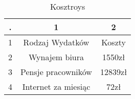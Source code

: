 \begin{table}[htbp]
\centering
\begin{tabular}{||c c c ||} 
 \hline
 . & 1 & 2  \\ [0.5ex] 
 \hline\hline
 1 & Rodzaj Wydatków & Koszty   \\ 
 \hline
 2 & Wynajem biura & 1550zł  \\
 \hline
 3 & Pensje pracowników & 12839zł  \\
 \hline
 4 & Internet za miesiąc & 72zł  \\
 \hline

 \hline
\end{tabular}
\label{tab:random_numbers}
\caption{Kosztroys}
\end{table}